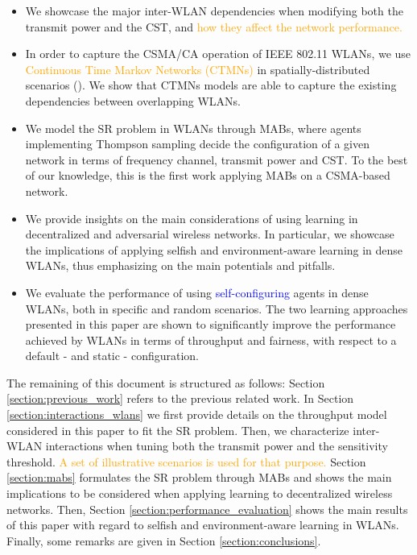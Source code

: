 \documentclass[preprint,12pt]{elsarticle}
\begin{document}
\begin{itemize}
	\item We showcase the major inter-WLAN dependencies when modifying both the transmit power and the CST, and \textcolor{orange}{how they affect the network performance.}
	\item In order to capture the CSMA/CA operation of IEEE 802.11 WLANs, we use \textcolor{orange}{Continuous Time Markov Networks (CTMNs)} in spatially-distributed scenarios (\citealp{bellalta2017throughput}). We show that CTMNs models are able to capture the existing dependencies between overlapping WLANs. 	
	\item We model the SR problem in WLANs through MABs, where agents implementing Thompson sampling decide the configuration of a given network in terms of frequency channel, transmit power and CST. To the best of our knowledge, this is the first work applying MABs on a CSMA-based network.
	\item We provide insights on the main considerations of using learning in decentralized and adversarial wireless networks. In particular, we showcase the implications of applying selfish and environment-aware learning in dense WLANs, thus emphasizing on the main potentials and pitfalls.
	\item We evaluate the performance of using \textcolor{blue}{self-configuring} agents in dense WLANs, both in specific and random scenarios. The two learning approaches presented in this paper are shown to significantly improve the performance achieved by WLANs in terms of throughput and fairness, with respect to a default - and static - configuration.
\end{itemize}		

The remaining of this document is structured as follows: Section \ref{section:previous_work} refers to the previous related work. In Section \ref{section:interactions_wlans} we first provide details on the throughput model considered in this paper to fit the SR problem. Then, we characterize inter-WLAN interactions when tuning both the transmit power and the sensitivity threshold. \textcolor{orange}{A set of illustrative scenarios is used for that purpose.} Section \ref{section:mabs} formulates the SR problem through MABs and shows the main implications to be considered when applying learning to decentralized wireless networks. Then, Section \ref{section:performance_evaluation} shows the main results of this paper with regard to selfish and environment-aware learning in WLANs. Finally, some remarks are given in Section \ref{section:conclusions}.
\end{document}
